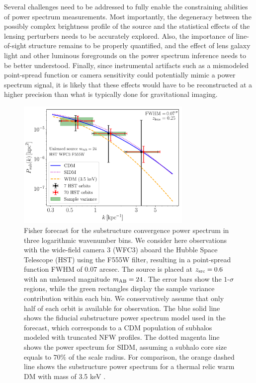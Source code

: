 Several challenges need to be addressed to fully enable the constraining abilities of power spectrum measurements. Most importantly, the degeneracy between the possibly complex brightness profile of the source and the statistical effects of the lensing perturbers needs to be accurately explored. Also, the importance of line-of-sight structure remains to be properly quantified, and the effect of lens galaxy light and other luminous foregrounds on the power spectrum inference needs to be better understood. Finally, since instrumental artifacts such as a mismodeled point-spread function or camera sensitivity could potentially mimic a power spectrum signal, it is likely that these effects would have to be reconstructed at a higher precision than what is typically done for gravitational imaging. 

\begin{figure}
\centering
\includegraphics[width=0.75\textwidth]{figures/Fisher_space_Pk_SIDM_rev.pdf}
\caption{Fisher forecast for the substructure convergence power spectrum in three logarithmic wavenumber bins. We consider here observations with the wide-field camera 3 (WFC3) aboard the Hubble Space Telescope (HST) using the F555W filter, resulting in a point-spread function FWHM of $0.07$ arcsec. The source is placed at $z_{\rm src}=0.6$ with an unlensed magnitude $m_{\rm AB}=24$. The error bars show the $1$-$\sigma$ regions, while the green rectangles display the sample variance contribution within each bin. We conservatively assume that only half of each orbit is available for observation. The blue solid line shows the fiducial substructure power spectrum model used in the forecast, which corresponds to a CDM population of subhalos modeled with truncated NFW profiles. The dotted magenta line shows the power spectrum for SIDM, assuming a subhalo core size equals to $70\%$ of the scale radius. For comparison, the orange dashed line shows the substructure power spectrum for a thermal relic warm DM with mass of 3.5 keV \citep{Viel:2013}. \label{fig:pksub_fisher}}
\end{figure}

